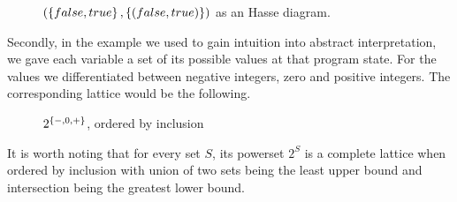 \documentclass[..thesis.tex]{subfiles}
\begin{document}
\begin{figure}[H]
  \begin{center}
  \end{center}
  \caption{$\left( \left\lbrace false, true \right\rbrace, \left\lbrace \left( false, true \right) \right\rbrace \right)$ as an Hasse diagram.}
\end{figure}
 
Secondly, in the example we used to gain intuition into abstract interpretation, we gave each variable a set of its possible values at that program state. For the values we differentiated between negative integers, zero and positive integers. The corresponding lattice would be the following.


\begin{figure}[H]
  \begin{center}
  \end{center}
  \caption{$2^{\left\lbrace -, 0, + \right\rbrace}$, ordered by inclusion}
\end{figure}

It is worth noting that for every set $S$, its powerset $2^S$ is a complete lattice when ordered by inclusion with union of two sets being the least upper bound and intersection being the greatest lower bound.
\end{document}

